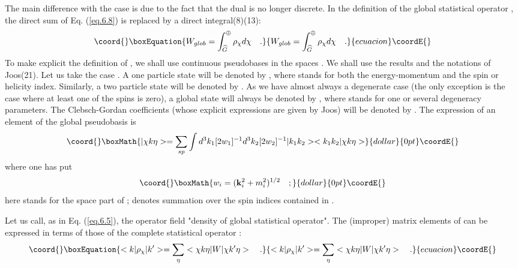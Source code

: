\documentclass[a4paper,11pt]{article}
\begin{document}
The main difference with the \coordHE{} case is due to the fact that the dual is no longer 
discrete. 
In the definition of the global statistical operator \coordHE{}, the direct sum of Eq. 
(\ref{eq.6.8}) is replaced by a direct integral(8)(13):
\begin{equation}\coord{}\boxEquation{
 \label{eq.6.15}
       W_{glob} = \int_{\Gc}^{\oplus} \rho_{\chi} d\chi   \quad .
}{
 W_{glob} = \int_{\Gc}^{\oplus} \rho_{\chi} d\chi   \quad .
}{ecuacion}\coordE{}\end{equation}
To make explicit the definition of \myHighlight{$\rho_{\chi}$}\coordHE{}, we shall use continuous pseudobases in the 
spaces \myHighlight{$\Hc_{\chi}$}\coordHE{}. We 
shall use the results and the notations of Joos(21). Let us take the case \coordHE{}. A one 
particle 
state will be denoted by \coordHE{}, where \coordHE{} stands for both the energy-momentum and the spin or 
helicity index. Similarly, a two particle state will be denoted by \coordHE{}. As we have 
almost 
always a degenerate case (the only exception is the case where at least one of the spins is 
zero), a global state will always be denoted by \coordHE{}, where \myHighlight{$\eta$}\coordHE{} stands for one or 
several 
degeneracy parameters. The Clebsch-Gordan coefficients (whose explicit expressions are given by 
Joos) will be denoted by  \coordHE{}. The expression of an element of the global 
pseudobasis is
$$\coord{}\boxMath{
| \chi k \eta> = \sum_{sp}\int d^3 k_1 [2w_1]^{-1} d^3 k_2 [2w_2]^{-1} | k_1k_2 ><k_1k_2 | \chi k \eta >
}{dollar}{0pt}\coordE{}$$
 where one has put
$$\coord{}\boxMath{
  w_i = (\mathbf{k}_i^2+m_i^2)^{1/2}  \quad  ;
}{dollar}{0pt}\coordE{}$$
here \coordHE{} stands for the space part of \coordHE{}; 
\coordHE{} denotes summation over the spin indices contained in \coordHE{}.
 
Let us call, as in Eq. (\ref{eq.6.5}), \myHighlight{$\rho$}\coordHE{} the operator field "density of global statistical 
operator". 
The (improper) matrix elements of \myHighlight{$\rho_{\chi}$}\coordHE{} can be expressed in terms of those of the 
complete statistical operator \coordHE{}:
\begin{equation}\coord{}\boxEquation{
 \label{eq.6.16}
       <k |\rho_{\chi} | k'> = \sum_{\eta} < \chi k \eta | W |\chi k' \eta >  \quad .
}{
 <k |\rho_{\chi} | k'> = \sum_{\eta} < \chi k \eta | W |\chi k' \eta >  \quad .
}{ecuacion}\coordE{}\end{equation}
\end{document}
